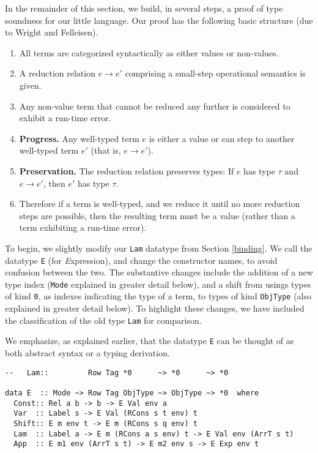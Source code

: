 \documentclass[11pt,twoside,A4]{llncs}
\begin{document}
In the remainder of this section, we build, in several steps, a 
proof of type soundness for our little language. 
Our proof has the following basic structure (due to Wright and Felleisen)\cite{Wright:94}.
\begin{enumerate}
\item All terms are categorized syntactically as either values or non-values.
\item A reduction relation $e \rightarrow e'$ comprising 
        a small-step operational semantics is given.
\item Any non-value term that cannot be reduced any further is considered to 
        exhibit a run-time error.
\item \textbf{Progress.} Any well-typed term $e$ is either a value or can
        step to another well-typed term $e'$ (that is, $e \rightarrow e'$).
\item \textbf{Preservation.} The reduction relation preserves types: 
      If $e$ has type $\tau$ and $e \rightarrow e'$, then $e'$ has type $\tau$.
\item Therefore if a term is well-typed, and we reduce it until no more
        reduction steps are possible, then the resulting term must be a value
        (rather than a term exhibiting a run-time error).
\end{enumerate}

To begin, we slightly modify our {\tt Lam} datatype
from Section \ref{binding}. We call the datatype {\tt E}
(for {\it E}xpression), and change the constructor names,
to avoid confusion between the two. The substantive changes
include the addition of a new type index ({\tt Mode} explained
in greater detail below),
and a shift from usings types of kind {\tt *0}, as indexes
indicating the type of a term, to types of kind {\tt ObjType}
(also explained in greater detail below). 
To highlight
these changes, we have included the classification
of the old type {\tt Lam} for comparison.

We emphasize, as explained earlier, that
the datatype {\tt E} can
be thought of as both abstract syntax or a typing derivation.

{\small
\begin{verbatim}
--   Lam::         Row Tag *0      ~> *0      ~> *0

data E  :: Mode ~> Row Tag ObjType ~> ObjType ~> *0  where
  Const:: Rel a b -> b -> E Val env a
  Var  :: Label s -> E Val (RCons s t env) t
  Shift:: E m env t -> E m (RCons s q env) t
  Lam  :: Label a -> E m (RCons a s env) t -> E Val env (ArrT s t)
  App  :: E m1 env (ArrT s t) -> E m2 env s -> E Exp env t
\end{verbatim}}
\end{document}
